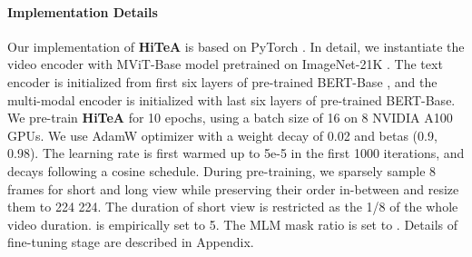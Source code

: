 \documentclass[10pt,twocolumn,letterpaper]{article}
\newcommand{\modelname}{\textbf{HiTeA}\xspace}
\begin{document}
\paragraph{Implementation Details}
Our implementation of \modelname is based on PyTorch \cite{paszke2019pytorch}. In detail, we instantiate the video encoder with MViT-Base model \cite{li2022mvitv2} pretrained on ImageNet-21K \cite{ridnik2021imagenet}. The text encoder is initialized from first six layers of pre-trained BERT-Base \cite{devlin2018bert}, and the multi-modal encoder is initialized with last six layers of pre-trained BERT-Base. We pre-train \modelname for 10 epochs, using a batch size of 16 on 8 NVIDIA A100 GPUs. We use AdamW \cite{kingma2014adam} optimizer with a weight decay of 0.02 and betas (0.9, 0.98). The learning rate is first warmed up to 5e-5 in the first 1000 iterations, and decays following a cosine schedule. During pre-training, we sparsely sample 8 frames for short and long view while preserving their order in-between and resize them to 224  224. The duration of short view is restricted as the 1/8 of the whole video duration.  is empirically set to 5. The MLM mask ratio is set to . Details of fine-tuning stage are described in Appendix.
\end{document}
